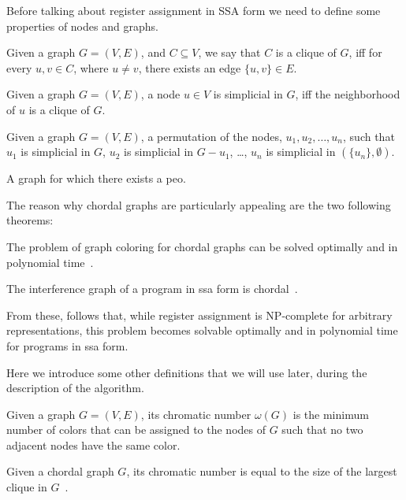 Before talking about register assignment in SSA form we need to define some properties of nodes and graphs.

\begin{definition}[Clique]\label{def:clique}
  Given a graph $G = (V, E)$, and $C \subseteq V$, we say that $C$ is a clique of $G$, iff for every $u, v \in C$, where $u \neq v$, there exists an edge $\{ u, v \} \in E$.
\end{definition}

\begin{definition}\label{def:simplicial}
  Given a graph $G = (V, E)$, a node $u \in V$ is simplicial in $G$, iff the neighborhood of $u$ is a clique of $G$.
\end{definition}

\begin{definition}
  Given a graph $G = (V, E)$, a permutation of the nodes, $u_1, u_2, \dots, u_n$, such that $u_1$ is simplicial in $G$, $u_2$ is simplicial in $G - u_1$, \dots, $u_n$ is simplicial in $(\{ u_n \}, \emptyset)$.
\end{definition}

\begin{definition}\label{def:chordal}
  A graph for which there exists a \gls{peo}.
\end{definition}

The reason why chordal graphs are particularly appealing are the two following theorems:

\begin{theorem}
  The problem of graph coloring for chordal graphs can be solved optimally and in polynomial time~\cite{golumbic2004algorithmic}.
\end{theorem}

\begin{theorem}
  The interference graph of a program in \gls{ssa} form is chordal~\cite{HGG:2006:RA_SSA}.
\end{theorem}

From these, follows that, while register assignment is NP-complete for arbitrary representations, this problem becomes solvable optimally and in polynomial time for programs in \gls{ssa} form.

Here we introduce some other definitions that we will use later, during the description of the algorithm.

\begin{definition}\label{def:chromatic}
  Given a graph $G = (V, E)$, its chromatic number $\omega(G)$ is the minimum number of colors that can be assigned to the nodes of $G$ such that no two adjacent nodes have the same color.
\end{definition}

\begin{theorem}\label{thm:chordal-chromatic}
  Given a chordal graph $G$, its chromatic number is equal to the size of the largest clique in $G$~\cite{golumbic2004algorithmic}.
\end{theorem}